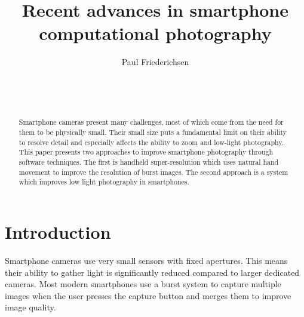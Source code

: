\documentclass{sig-alternate}
\begin{document}

\title{Recent advances in smartphone computational photography}


\author{
\alignauthor
Paul Friederichsen\\
	\\
	\\
	\\
}

\maketitle

\begin{abstract}

Smartphone cameras present many challenges, most of which come from the need for them to be physically small. Their small size puts a fundamental limit on their ability to resolve detail and especially affects the ability to zoom and low-light photography. This paper presents two approaches to improve smartphone photography through software techniques. The first is handheld super-resolution which uses natural hand movement to improve the resolution of burst images. The second approach is a system which improves low light photography in smartphones.

\end{abstract}


\section{Introduction}

Smartphone cameras use very small sensors with fixed apertures. This means their ability to gather light is significantly reduced compared to larger dedicated cameras. Most modern smartphones use a burst system to capture multiple images when the user presses the capture button and merges them to improve image quality. 
\end{document}
